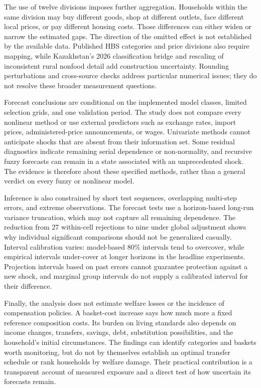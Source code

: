 \documentclass[11pt,a4paper]{article}
\begin{document}
The use of twelve divisions imposes further aggregation. Households within the same division may buy different goods, shop at different outlets, face different local prices, or pay different housing costs. Those differences can either widen or narrow the estimated gaps. The direction of the omitted effect is not established by the available data. Published HBS categories and price divisions also require mapping, while Kazakhstan's 2026 classification bridge and rescaling of inconsistent rural nonfood detail add construction uncertainty. Rounding perturbations and cross-source checks address particular numerical issues; they do not resolve these broader measurement questions.



Forecast conclusions are conditional on the implemented model classes, limited selection grids, and one validation period. The study does not compare every nonlinear method or use external predictors such as exchange rates, import prices, administered-price announcements, or wages. Univariate methods cannot anticipate shocks that are absent from their information set. Some residual diagnostics indicate remaining serial dependence or non-normality, and recursive fuzzy forecasts can remain in a state associated with an unprecedented shock. The evidence is therefore about these specified methods, rather than a general verdict on every fuzzy or nonlinear model.

Inference is also constrained by short test sequences, overlapping multi-step errors, and extreme observations. The forecast tests use a horizon-based long-run variance truncation, which may not capture all remaining dependence. The reduction from 27 within-cell rejections to nine under global adjustment shows why individual significant comparisons should not be generalized casually. Interval calibration varies: model-based 80\% intervals tend to overcover, while empirical intervals under-cover at longer horizons in the headline experiments. Projection intervals based on past errors cannot guarantee protection against a new shock, and marginal group intervals do not supply a calibrated interval for their difference.

Finally, the analysis does not estimate welfare losses or the incidence of compensation policies. A basket-cost increase says how much more a fixed reference composition costs. Its burden on living standards also depends on income changes, transfers, savings, debt, substitution possibilities, and the household's initial circumstances. The findings can identify categories and baskets worth monitoring, but do not by themselves establish an optimal transfer schedule or rank households by welfare damage. Their practical contribution is a transparent account of measured exposure and a direct test of how uncertain its forecasts remain.
\end{document}
